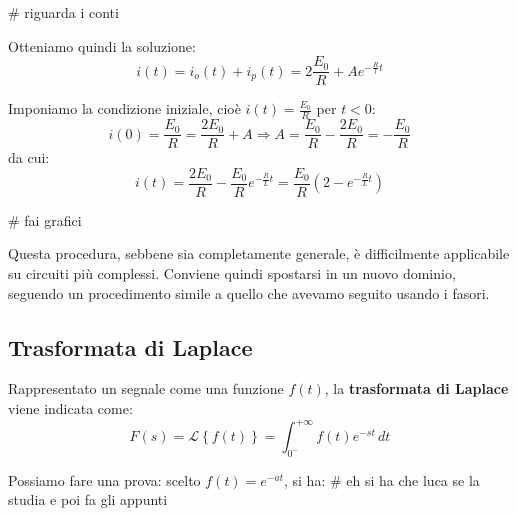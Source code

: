 \documentclass[a4paper,11pt]{article}
\begin{document}
# riguarda i conti

Otteniamo quindi la soluzione:
$$
i(t) = i_o(t) + i_p(t) = 2 \frac{E_0}{R} + A e^{-\frac{R}{l}t}
$$

Imponiamo la condizione iniziale, cioè $i(t) = \frac{E_0}{R}$ per $t < 0$:
$$
i(0) = \frac{E_0}{R} = \frac{2 E_0}{R} + A \Rightarrow A = \frac{E_0}{R} - \frac{2 E_0}{R} = -\frac{E_0}{R}
$$
da cui:
$$
i(t) = \frac{2 E_0}{R} - \frac{E_0}{R} e^{-\frac{R}{L}t} = \frac{E_0}{R}\left( 2 - e^{-\frac{R}{L}t} \right)
$$

# fai grafici

Questa procedura, sebbene sia completamente generale, è difficilmente applicabile su circuiti più complessi.
Conviene quindi spostarsi in un nuovo dominio, seguendo un procedimento simile a quello che avevamo seguito usando i fasori.

\subsection{Trasformata di Laplace}
Rappresentato un segnale come una funzione $f(t)$, la \textbf{trasformata di Laplace} viene indicata come:
$$
F(s) = \mathcal{L} \left\{ f(t) \right\} = \int_{0^-}^{+\infty} f(t)e^{-st} \, dt
$$

Possiamo fare una prova: scelto $f(t) = e^{-at}$, si ha:
# eh si ha che luca se la studia e poi fa gli appunti
\end{document}
